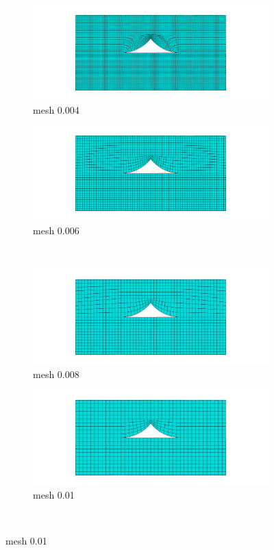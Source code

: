 \begin{figure}[htb]
\centering
  \begin{subfigure}[b]{0.48\textwidth}
    \includegraphics[width=\textwidth]{chapter_7_non-elasticmodelling/figures/mesh0004.png}
    \caption{ mesh 0.004}
  \end{subfigure}
  \begin{subfigure}[b]{0.48\textwidth}
    \includegraphics[width=\textwidth]{chapter_7_non-elasticmodelling/figures/mesh0006.png}
    \caption{ mesh 0.006}
  \end{subfigure}
  \\
    \begin{subfigure}[b]{0.48\textwidth}
    \includegraphics[width=\textwidth]{chapter_7_non-elasticmodelling/figures/mesh0008.png}
    \caption{ mesh 0.008}
  \end{subfigure}
  \begin{subfigure}[b]{0.48\textwidth}
    \includegraphics[width=\textwidth]{chapter_7_non-elasticmodelling/figures/mesh001.png}
    \caption{ mesh 0.01}
  \end{subfigure}
  \\
  

\end{figure}
